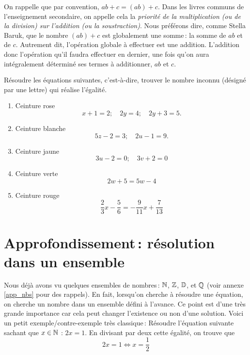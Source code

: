 		On rappelle que par convention, $ab+c=(ab)+c$. Dans les livres communs de l'enseignement secondaire, on appelle cela la \emph{priorité de la multiplication (ou de la division) sur l'addition (ou la soustraction)}. Nous préférons dire, comme Stella Baruk, que le nombre $(ab)+c$ est globalement une somme\,: la somme de $ab$ et de $c$. Autrement dit, l'opération globale à effectuer est une addition. L'addition donc l'opération qu'il faudra effectuer en dernier, une fois qu'on aura intégralement déterminé ses termes à additionner, $ab$ et $c$. 


		\begin{exo}
			Résoudre les équations suivantes, c'est-à-dire, trouver le nombre inconnu (désigné par une lettre) qui réalise l'égalité.
			\begin{enumerate}
				\item Ceinture rose
				\begin{equation}
				 	x+1=2;\quad 2y=4;\quad 2y+3=5.
				\end{equation} 
				\item Ceinture blanche
				\begin{equation}
					5z-2=3;\quad 2u-1=9.
				\end{equation}
				\item Ceinture jaune
				\begin{equation}
					3u-2=0;\quad 3v+2=0
				\end{equation}
				\item Ceinture verte
				\begin{equation}
					2w+5=5w-4
				\end{equation}
				\item Ceinture rouge
				\begin{equation}
					\frac{2}{3}x-\frac{5}{6}=-\frac{9}{11}x+\frac{7}{13}
				\end{equation}
			\end{enumerate}
		\end{exo}
	\section{Approfondissement\,: résolution dans un ensemble}

		Nous déjà avons vu quelques ensembles de nombres\,: $\mathbb{N}$, $\mathbb{Z}$, $\mathbb{D}$, et $\mathbb{Q}$ (voir annexe \ref{app_nbs} pour des rappels).
		En fait, lorsqu'on cherche à résoudre une équation, on cherche un nombre dans un ensemble défini à l'avance. Ce point est d'une très grande importance car cela peut changer l'existence ou non d'une solution. Voici un petit exemple/contre-exemple très classique\,:
		Résoudre l'équation suivante sachant que $x\in \mathbb{N}$ : $2x=1$. En divisant par deux cette égalité, on trouve que
		\begin{equation}
			2x=1 \Leftrightarrow x=\frac{1}{2} 
		\end{equation}

